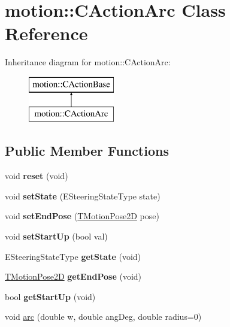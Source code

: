 \hypertarget{classmotion_1_1CActionArc}{}\section{motion\+:\+:C\+Action\+Arc Class Reference}
\label{classmotion_1_1CActionArc}
Inheritance diagram for motion\+:\+:C\+Action\+Arc\+:\begin{figure}[H]
\begin{center}
\leavevmode
\includegraphics[height=2.000000cm]{classmotion_1_1CActionArc}
\end{center}
\end{figure}
\subsection*{Public Member Functions}
\begin{DoxyCompactItemize}
\item 
\mbox{\label{classmotion_1_1CActionArc_a7b8746c8652bb865f2b606608dffbb16}} 
void {\bfseries reset} (void)
\item 
\mbox{\label{classmotion_1_1CActionArc_a45356c022471267db143fd1300f6b465}} 
void {\bfseries set\+State} (E\+Steering\+State\+Type state)
\item 
\mbox{\label{classmotion_1_1CActionArc_ad6f08adc549f8d19892e0a6a257415dc}} 
void {\bfseries set\+End\+Pose} (\mbox{\hyperlink{structmotion_1_1TMotionPose2D}{T\+Motion\+Pose2D}} pose)
\item 
\mbox{\label{classmotion_1_1CActionArc_a6af47c85b3b8226b6ae5bc3e27185e77}} 
void {\bfseries set\+Start\+Up} (bool val)
\item 
\mbox{\label{classmotion_1_1CActionArc_ae196348547fee7f670bb91f66b55fa36}} 
E\+Steering\+State\+Type {\bfseries get\+State} (void)
\item 
\mbox{\label{classmotion_1_1CActionArc_ad5ff8628c709a14cbcffb030894daa93}} 
\mbox{\hyperlink{structmotion_1_1TMotionPose2D}{T\+Motion\+Pose2D}} {\bfseries get\+End\+Pose} (void)
\item 
\mbox{\label{classmotion_1_1CActionArc_aa2ee90e89b02256cd0c3f422f220caca}} 
bool {\bfseries get\+Start\+Up} (void)
\item 
void \mbox{\hyperlink{classmotion_1_1CActionArc_a64a6fc339df29d196786291f02b2802e}{arc}} (double w, double ang\+Deg, double radius=0)
\end{DoxyCompactItemize}
